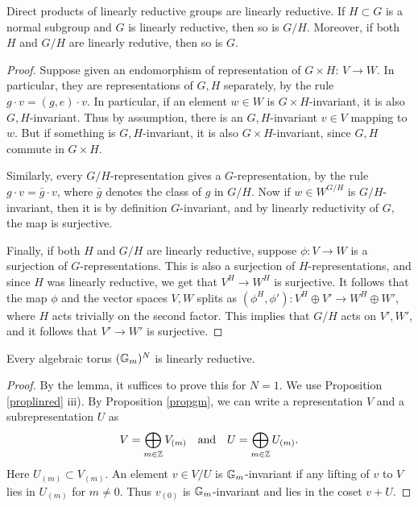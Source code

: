 \documentclass[11pt, english]{article}
\begin{document}
\begin{lemma}
\label{linredprod}
Direct products of linearly reductive groups are linearly reductive. If $H \subset G$ is a normal subgroup and $G$ is linearly reductive, then so is $G/H$. Moreover, if both $H$ and $G/H$ are linearly redutive, then so is $G$.
\end{lemma}
\begin{proof}
Suppose given an endomorphism of representation of $G \times H$: $V \to W$. In particular, they are representations of $G,H$ separately, by the rule $g \cdot v = (g,e) \cdot v$. In particular, if an element $w \in W$ is $G \times H$-invariant, it is also $G,H$-invariant. Thus by assumption, there is an $G,H$-invariant $v \in V$ mapping to $w$. But if something is $G,H$-invariant, it is also $G \times H$-invariant, since $G,H$ commute in $G \times H$.

Similarly, every $G/H$-representation gives a $G$-representation, by the rule $g \cdot v = \bar g \cdot v$, where $\bar g$ denotes the class of $g$ in $G/H$. Now if $w \in W^{G/H}$ is $G/H$-invariant, then it is by definition $G$-invariant, and by linearly reductivity of $G$, the map is surjective.

Finally, if both $H$ and $G/H$ are linearly reductive, suppose $\phi:V \to W$ is a surjection of $G$-representations. This is also a surjection of $H$-representations, and since $H$ was linearly reductive, we get that $V^H \to W^H$ is surjective. It follows that the map $\phi$ and the vector spaces $V,W$ splits as $(\phi^H,\phi'):V^H \oplus V' \to W^H \oplus W'$, where $H$ acts trivially on the second factor. This implies that $G/H$ acts on $V',W'$, and it follows that $V' \to W'$ is surjective.
\end{proof}

\begin{prop}
Every algebraic torus $(\mathbb{G}_m)^N$ is linearly reductive.
\end{prop}
\begin{proof}
By the lemma, it suffices to prove this for $N=1$. We use Proposition \ref{proplinred} iii). By Proposition \ref{propgm}, we can write a representation $V$ and a subrepresentation $U$ as
\begin{align*}
V = \bigoplus_{m \in \mathbb{Z}} V_{(m)} & &\text{and}& & U = \bigoplus_{m \in \mathbb{Z}} U_{(m)}.
\end{align*}
Here $U_{(m)} \subset V_{(m)}$. An element $v \in V/U$ is $\mathbb{G}_m$-invariant if any lifting of $v$ to $V$ lies in $U_{(m)}$ for $m \neq 0$. Thus $v_{(0)}$ is $\mathbb{G}_m$-invariant and lies in the coset $v+U$.
\end{proof}
\end{document}
